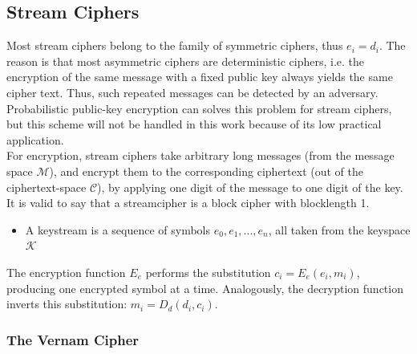 \subsection{Stream Ciphers}
Most stream ciphers belong to the family of symmetric ciphers, thus $e_i = d_i$. The reason is that most asymmetric ciphers are deterministic ciphers,
i.e. the encryption of the same message with a fixed public key always yields the same cipher text. Thus, such repeated messages can be detected by 
an adversary. 
Probabilistic public-key encryption can solves this problem for stream ciphers,
but this scheme will not be handled in this work because of its low practical application.
\\
For encryption, stream ciphers take arbitrary long messages (from the message space $\mathcal{M}$), and encrypt
them to the corresponding ciphertext (out of the ciphertext-space $\mathcal{C}$), by applying
one digit of the message to one digit of the key. It is valid to say that a streamcipher is a block cipher with blocklength 1.
\begin{itemize}
 \item A keystream is a sequence of symbols $e_0, e_1, ..., e_n$, all taken from the keyspace $\mathcal{K}$
\end{itemize}
The encryption function $E_e$ performs the substitution $c_i = E_e(e_i, m_i)$, producing one encrypted symbol at a time. Analogously,
the decryption function inverts this substitution: $m_i = D_d(d_i, c_i)$.

\subsubsection{The Vernam Cipher} 

